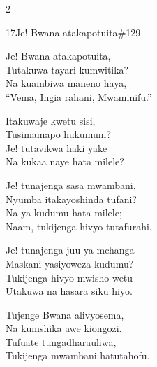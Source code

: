 \documentclass{article}
\begin{document}
\begin{multicols}{2}
\begin{hymn}{17}{Je! Bwana atakapotuita}{\#129}
\begin{stanza}
Je! Bwana atakapotuita,\\
Tutakuwa tayari kumwitika?\\
Na kuambiwa maneno haya,\\
``Vema, Ingia rahani, Mwaminifu.''
\end{stanza}
\begin{chorus}
Itakuwaje kwetu sisi,\\
Tusimamapo hukumuni?\\
Je! tutavikwa haki yake\\
Na kukaa naye hata milele?
\end{chorus}
\begin{stanza}
Je! tunajenga sasa mwambani,\\
Nyumba itakayoshinda tufani?\\
Na ya kudumu hata milele;\\
Naam, tukijenga hivyo tutafurahi.
\end{stanza}
\begin{stanza}
Je! tunajenga juu ya mchanga\\
Maskani yasiyoweza kudumu?\\
Tukijenga hivyo mwisho wetu\\
Utakuwa na hasara siku hiyo.
\end{stanza}
\begin{stanza}
Tujenge Bwana alivyosema,\\
Na kumshika awe kiongozi.\\
Tufuate tungadharauliwa,\\
Tukijenga mwambani hatutahofu.
\end{stanza}
\end{hymn}


\end{multicols}
\end{document}
